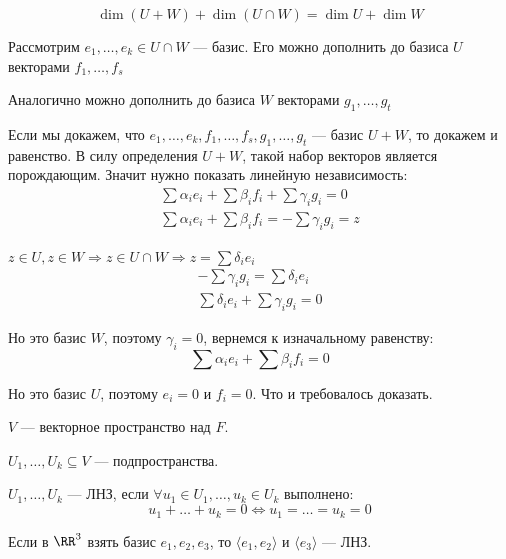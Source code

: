 \begin{lemma}{}{}
    \[
        \dim ( U + W ) + \dim ( U \cap W ) = \dim U + \dim W
    \]
\end{lemma}

Рассмотрим \( e_1, \ldots, e_k \in U \cap W \) --- базис.
Его можно дополнить до базиса \( U \) векторами \( f_1, \ldots, f_s \)

Аналогично можно дополнить до базиса \( W \) векторами \( g_1, \ldots, g_t \)

Если мы докажем, что \( e_1, \ldots, e_k, f_1, \ldots, f_s, g_1, \ldots, g_t \) --- базис \( U + W \),
то докажем и равенство.
В силу определения \( U + W \),
такой набор векторов является порождающим.
Значит нужно показать линейную независимость:
\begin{gather*}
    \sum \alpha_i e_i + \sum \beta_i f_i + \sum \gamma_i g_i = 0
    \\
    \sum \alpha_i e_i + \sum \beta_i f_i = - \sum \gamma_i g_i = z
\end{gather*}

\( z \in U, z \in W \Rightarrow z \in U \cap W \Rightarrow z = \sum \delta_i e_i \)
\begin{gather*}
     - \sum \gamma_i g_i = \sum \delta_i e_i
     \\
     \sum \delta_i e_i + \sum \gamma_i g_i = 0
\end{gather*}

Но это базис \( W \), поэтому \( \gamma_i = 0 \), вернемся к изначальному равенству:
\[
    \sum \alpha_i e_i + \sum \beta_i f_i = 0
\]

Но это базис \( U \),
поэтому \( e_i = 0 \) и \( f_i = 0 \).
Что и требовалось доказать.

\begin{defn}{}{}
    \( V \) --- векторное пространство над \( F \).

    \( U_1, \ldots, U_k \subseteq V \) --- подпространства.

    \( U_1, \ldots, U_k \) --- ЛНЗ,
    если \( \forall u_1 \in U_1, \ldots, u_k \in U_k \) выполнено:
    \[
        u_1 + \ldots + u_k = 0 \Leftrightarrow u_1 = \ldots = u_k = 0
    \]
\end{defn}

\begin{example}{}{}
    Если в \( \RR^3 \) взять базис \( e_1, e_2, e_3 \),
    то \( \langle e_1, e_2 \rangle \) и \( \langle e_3 \rangle \) --- ЛНЗ.
\end{example}

\newpage

